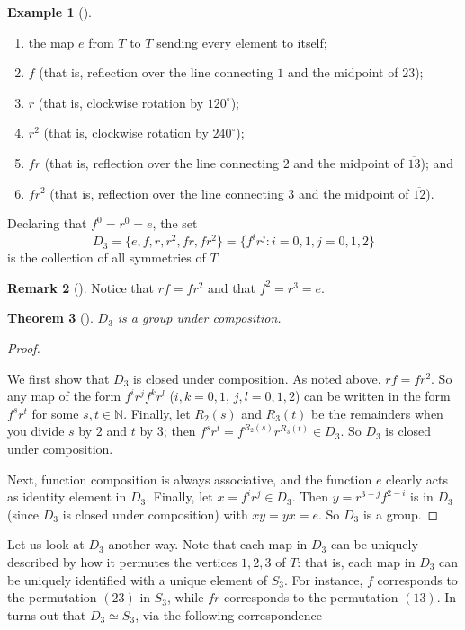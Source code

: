 \documentclass[10pt,]{book}
\theoremstyle{plain}
\newtheorem{theorem}{Theorem}[section]
\theoremstyle{definition}
\theoremstyle{definition}
\newtheorem{remark}[theorem]{Remark}
\theoremstyle{definition}
\newtheorem{example}[theorem]{Example}
\theoremstyle{definition}
\numberwithin{equation}{section}
\def\N{\mathbb{N}}
\begin{document}
\begin{example}[]
\begin{enumerate}
\item\hypertarget{li-334}{}the map \(e\) from \(T\) to \(T\) sending every element to itself;%
\item\hypertarget{li-335}{}\(f\) (that is, reflection over the line connecting \(1\) and the midpoint of \(\overline{23}\));%
\item\hypertarget{li-336}{}\(r\) (that is, clockwise rotation by \(120^{\circ}\));%
\item\hypertarget{li-337}{}\(r^2\) (that is, clockwise rotation by \(240^{\circ}\));%
\item\hypertarget{li-338}{}\(fr\) (that is, reflection over the line connecting \(2\) and the midpoint of \(\overline{13}\)); and%
\item\hypertarget{li-339}{}\(fr^2\) (that is, reflection over the line connecting \(3\) and the midpoint of \(\overline{12}\)).%
\end{enumerate}
%
\par
Declaring that \(f^0=r^0=e\), the set%
\begin{equation*}
D_3=\{e, f, r, r^2, fr, fr^2\}=\{f^ir^j:i=0,1, j=0,1,2\}
\end{equation*}
is the collection of all symmetries of \(T\).%
\end{example}
\begin{remark}[]\label{remark-30}
Notice that \(rf=fr^2\) and that \(f^2=r^3=e\).%
\end{remark}
\begin{theorem}[{}]\label{di3}
\(D_3\) is a group under composition.%
\end{theorem}
\begin{proof}\hypertarget{proof-31}{}
We first show that \(D_3\) is closed under composition. As noted above, \(rf=fr^2\). So any map of the form \(f^ir^jf^kr^l\) (\(i,k=0,1\), \(j,l=0,1,2\)) can be written in the form \(f^sr^t\) for some \(s,t \in \N\). Finally, let \(R_2(s)\) and \(R_3(t)\) be the remainders when you divide \(s\) by \(2\) and \(t\) by \(3\); then \(f^sr^t=f^{R_2(s)}r^{R_3(t)} \in D_3\). So \(D_3\) is closed under composition.%
\par
Next, function composition is always associative, and the function \(e\) clearly acts as identity element in \(D_3\). Finally, let \(x=f^ir^j\in D_3\). Then \(y=r^{3-j}f^{2-i}\) is in \(D_3\) (since \(D_3\) is closed under composition) with \(xy=yx=e\). So \(D_3\) is a group.%
\end{proof}
Let us look at \(D_3\) another way. Note that each map in \(D_3\) can be uniquely described by how it permutes the vertices \(1,2,3\) of \(T\): that is, each map in \(D_3\) can be uniquely identified with a unique element of \(S_3\). For instance, \(f\) corresponds to the permutation \((23)\) in \(S_3\), while \(fr\) corresponds to the permutation \((13)\). In turns out that \(D_3 \simeq S_3\), via the following correspondence%
\end{document}
